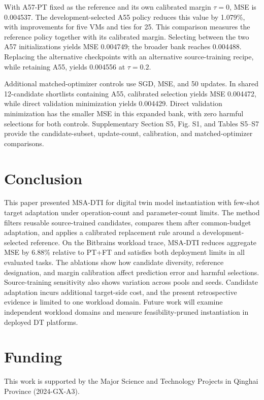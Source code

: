 \documentclass[a4paper,fleqn]{cas-sc}
\begin{document}


With A57-PT fixed as the reference and its own calibrated margin
$\tau=0$, MSE is 0.004537. The development-selected A55 policy reduces
this value by 1.079\%, with improvements for five VMs and ties for 25.
This comparison measures the reference policy together with its calibrated
margin. Selecting between the two A57 initializations yields MSE 0.004749;
the broader bank reaches 0.004488. Replacing the alternative checkpoints
with an alternative source-training recipe, while retaining A55, yields
0.004556 at $\tau=0.2$.

Additional matched-optimizer controls use SGD, MSE, and 50 updates. In
shared 12-candidate shortlists containing A55, calibrated selection yields MSE 0.004472,
while direct validation minimization yields 0.004429. Direct validation
minimization has the smaller MSE in this expanded bank, with zero harmful
selections for both controls.
Supplementary Section S5, Fig. S1, and Tables S5--S7 provide the candidate-subset,
update-count, calibration, and matched-optimizer comparisons.

\section{Conclusion}
\label{sec:conclusion}
This paper presented MSA-DTI for digital twin model instantiation with
few-shot target adaptation under operation-count and parameter-count limits.
The method filters reusable source-trained candidates, compares them after
common-budget adaptation, and applies a calibrated replacement rule around
a development-selected reference. On the Bitbrains workload trace,
MSA-DTI reduces aggregate MSE by 6.88\% relative to PT+FT and satisfies
both deployment limits in all evaluated tasks. The ablations show how
candidate diversity, reference designation, and margin calibration affect
prediction error and harmful selections. Source-training sensitivity also
shows variation across pools and seeds. Candidate adaptation incurs
additional target-side cost, and the present retrospective evidence is
limited to one workload domain. Future work will examine independent
workload domains and measure feasibility-pruned instantiation in deployed
DT platforms.


\section*{Funding}
This work is supported by the Major Science and Technology Projects in Qinghai
Province (2024-GX-A3).
\end{document}
